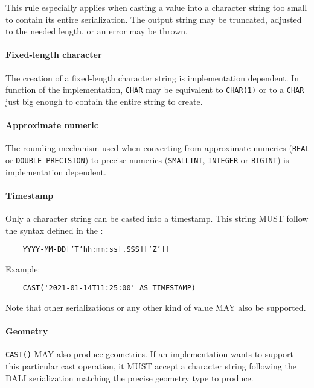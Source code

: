 \documentclass[11pt,a4paper]{ivoa}
\begin{document}
This rule especially applies when casting a value into a character string too
small to contain its entire serialization. The output string may be truncated,
adjusted to the needed length, or an error may be thrown.

\paragraph{Fixed-length character}

The creation of a fixed-length character string is implementation dependent.
In function of the implementation, \verb:CHAR: may be equivalent to
\verb:CHAR(1): or to a \verb:CHAR: just big enough to contain the entire string
to create.

\paragraph{Approximate numeric}

The rounding mechanism used when converting from approximate numerics
(\verb:REAL: or \verb:DOUBLE PRECISION:) to precise numerics (\verb:SMALLINT:,
\verb:INTEGER: or \verb:BIGINT:) is implementation dependent.

\paragraph{Timestamp}

Only a character string can be casted into a timestamp. This string MUST follow
the syntax defined in the \DALISpec{}:
\begin{verbatim}
    YYYY-MM-DD[’T’hh:mm:ss[.SSS][’Z’]]
\end{verbatim}

Example:

\begin{verbatim}
    CAST('2021-01-14T11:25:00' AS TIMESTAMP)
\end{verbatim}

Note that other serializations or any other kind of value MAY also be supported.

\paragraph{Geometry}

\verb:CAST(): MAY also produce geometries. If an implementation wants to support
this particular cast operation, it MUST accept a character string following the
DALI serialization matching the precise geometry type to produce.
\end{document}
